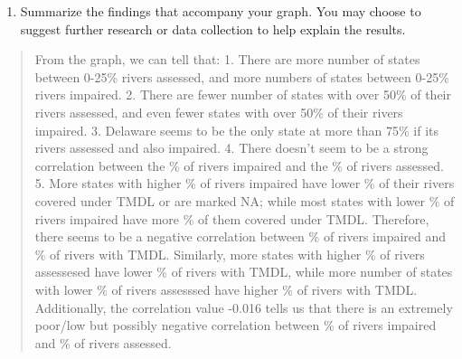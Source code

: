 \documentclass[]{article}
\providecommand{\tightlist}{%
  \setlength{\itemsep}{0pt}\setlength{\parskip}{0pt}}
\begin{document}
\begin{enumerate}
\def\labelenumi{\arabic{enumi}.}
\setcounter{enumi}{11}
\tightlist
\item
  Summarize the findings that accompany your graph. You may choose to
  suggest further research or data collection to help explain the
  results.
\end{enumerate}

\begin{quote}
From the graph, we can tell that: 1. There are more number of states
between 0-25\% rivers assessed, and more numbers of states between
0-25\% rivers impaired. 2. There are fewer number of states with over
50\% of their rivers assessed, and even fewer states with over 50\% of
their rivers impaired. 3. Delaware seems to be the only state at more
than 75\% if its rivers assessed and also impaired. 4. There doesn't
seem to be a strong correlation between the \% of rivers impaired and
the \% of rivers assessed. 5. More states with higher \% of rivers
impaired have lower \% of their rivers covered under TMDL or are marked
NA; while most states with lower \% of rivers impaired have more \% of
them covered under TMDL. Therefore, there seems to be a negative
correlation between \% of rivers impaired and \% of rivers with TMDL.
Similarly, more states with higher \% of rivers assessesed have lower \%
of rivers with TMDL, while more number of states with lower \% of rivers
assesssed have higher \% of rivers with TMDL. Additionally, the
correlation value -0.016 tells us that there is an extremely poor/low
but possibly negative correlation between \% of rivers impaired and \%
of rivers assessed.
\end{quote}
\end{document}
